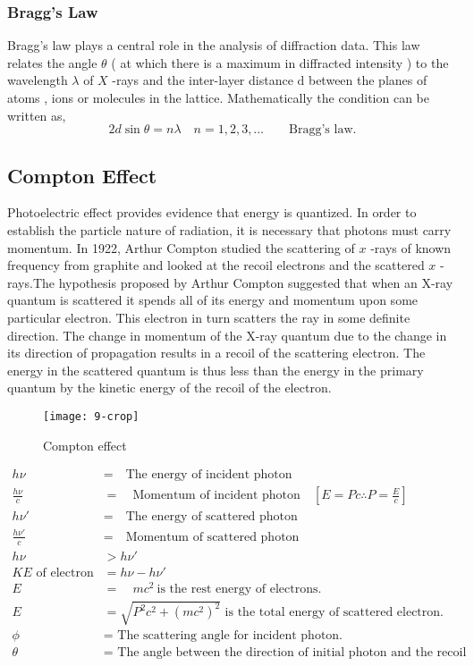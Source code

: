 \subsubsection{Bragg's Law}
Bragg's  law plays a central role in  the analysis of diffraction data. This law relates the angle $\theta$ ( at which there is a maximum in diffracted intensity ) to the wavelength $\lambda$ of $X$ -rays and the inter-layer distance $\mathrm{d}$ between the planes of atoms , ions or molecules in the lattice. 
Mathematically the condition can be  written as,
\begin{equation}
2 d \sin \theta=n \lambda \quad n=1,2,3, \ldots
\qquad \text{Bragg's law.}
\end{equation}

\subsection{Compton Effect}
Photoelectric effect provides evidence that energy is quantized. In order to establish the particle nature of radiation, it is necessary that photons must carry momentum.  In 1922, Arthur Compton studied the scattering of $x$ -rays of known frequency from graphite and looked at the recoil electrons and the scattered $x$ -rays.The hypothesis proposed by Arthur Compton  suggested that when an X-ray quantum is scattered it spends all of its energy and momentum upon some particular electron. This electron in turn scatters the ray in some definite direction. The change in momentum of the X-ray quantum due to the change in its direction of propagation results in a recoil of the scattering electron. The energy in the scattered quantum is thus less than the energy in the primary quantum by the kinetic energy of the recoil of the electron.
\begin{figure}[H]
	\centering
	\texttt{[image: 9-crop]}
	\caption{Compton effect}
	\label{}
\end{figure}
\begin{align*}
h\nu&=\quad \text{The energy of incident photon}\\
\frac{h\nu}{c}&=\quad \text{Momentum of incident photon}\quad [E=Pc \therefore P=\frac{E}{c}]\\
h\nu\prime&=\quad\text{The energy of scattered photon}\\
\frac{h\nu\prime}{c}&=\quad \text{Momentum of scattered photon}\\
h\nu&>h\nu\prime\\
KE \text{ of electron }&=h\nu-h\nu\prime\\
E&=\quad mc^2 \ \text{is the rest energy of electrons. }\\
E&=\sqrt{P^2c^2+(mc^2)^2}\text{ is the total energy of scattered electron.}\\
\phi&=\text{ The scattering angle for incident photon.}\\
\theta&= \text{ The angle between the direction of initial photon and the recoil electron.}
\end{align*}
